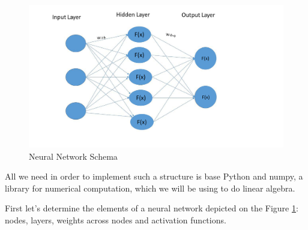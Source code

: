 \begin{figure}[H]
    \includegraphics[width=\linewidth]{pics/neural_network1.jpg}
    \caption{\label{fig:nn-schema} Neural Network Schema}
\end{figure}

All we need in order to implement such a structure is base Python and numpy, a library for numerical computation, which we will be using to do linear algebra. 

First let's determine the elements of a neural network depicted on the Figure \ref{fig:nn-schema}: nodes, layers, weights across nodes and activation functions.

